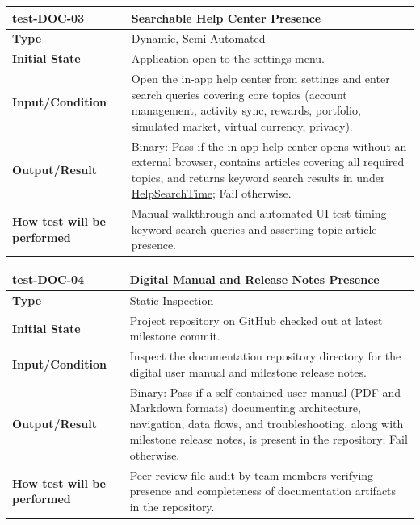 \documentclass[12pt, titlepage]{article}
\newcommand{\const}[1]{\hyperlink{const:#1}{\textsf{#1}}}
\begin{document}
\noindent\begin{tabularx}{\textwidth}{>{\raggedright\arraybackslash}p{3.5cm}X}
  \toprule
  \textbf{test-DOC-03} & \textbf{Searchable Help Center Presence}\\
  \midrule
  \textbf{Type} & Dynamic, Semi-Automated\\
  \textbf{Initial State} & Application open to the settings menu.\\
  \textbf{Input/Condition} & Open the in-app help center from settings and enter search queries covering core topics (account management, activity sync, rewards, portfolio, simulated market, virtual currency, privacy).\\
  \textbf{Output/Result} & Binary: Pass if the in-app help center opens without an external browser, contains articles covering all required topics, and returns keyword search results in under \const{HelpSearchTime}; Fail otherwise.\\
  \textbf{How test will be performed} & Manual walkthrough and automated UI test timing keyword search queries and asserting topic article presence.\\
  \bottomrule
\end{tabularx}

\vspace{1em}

\noindent\begin{tabularx}{\textwidth}{>{\raggedright\arraybackslash}p{3.5cm}X}
  \toprule
  \textbf{test-DOC-04} & \textbf{Digital Manual and Release Notes Presence}\\
  \midrule
  \textbf{Type} & Static Inspection\\
  \textbf{Initial State} & Project repository on GitHub checked out at latest milestone commit.\\
  \textbf{Input/Condition} & Inspect the documentation repository directory for the digital user manual and milestone release notes.\\
  \textbf{Output/Result} & Binary: Pass if a self-contained user manual (PDF and Markdown formats) documenting architecture, navigation, data flows, and troubleshooting, along with milestone release notes, is present in the repository; Fail otherwise.\\
  \textbf{How test will be performed} & Peer-review file audit by team members verifying presence and completeness of documentation artifacts in the repository.\\
  \bottomrule
\end{tabularx}
\end{document}
